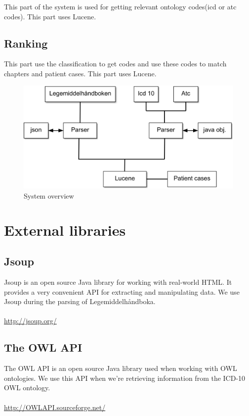 This part of the system is used for getting relevant ontology codes(icd or atc
codes). This part uses Lucene.

\subsection*{Ranking}

This part use the classification to get codes and use these codes to match
chapters and patient cases. This part uses Lucene.


\begin{figure}[htb]
\begin{center}
	\includegraphics[width=\textwidth]{figures/system-overview}
\end{center}
\caption{System overview}
\label{fig:system-overview}
\end{figure}

\section{External libraries}
\label{sec:external-libraries}

\subsection*{Jsoup}
Jsoup is an open source Java library for working with real-world HTML. It
provides a very convenient API for extracting and manipulating data. We use
Jsoup during the parsing of Legemiddelhåndboka.\\\\
\url{http://jsoup.org/}

\subsection*{The OWL API}
The OWL API is an open source Java library used when working with OWL
ontologies. We use this API when we’re retrieving information from the ICD-10
OWL ontology.\\\\
\url{http://OWLAPI.sourceforge.net/}

